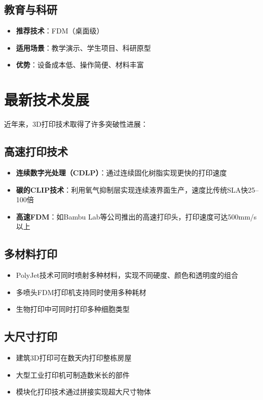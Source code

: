 \documentclass[12pt,UTF8]{ctexbook}
\begin{document}
\subsection{教育与科研}
\begin{itemize}
\item \textbf{推荐技术}：FDM（桌面级）
\item \textbf{适用场景}：教学演示、学生项目、科研原型
\item \textbf{优势}：设备成本低、操作简便、材料丰富
\end{itemize}

\section{最新技术发展}

近年来，3D打印技术取得了许多突破性进展：

\subsection{高速打印技术}
\begin{itemize}
\item \textbf{连续数字光处理（CDLP）}：通过连续固化树脂实现更快的打印速度
\item \textbf{碳的CLIP技术}：利用氧气抑制层实现连续液界面生产，速度比传统SLA快25--100倍
\item \textbf{高速FDM}：如Bambu Lab等公司推出的高速打印头，打印速度可达500mm/s以上
\end{itemize}

\subsection{多材料打印}
\begin{itemize}
\item PolyJet技术可同时喷射多种材料，实现不同硬度、颜色和透明度的组合
\item 多喷头FDM打印机支持同时使用多种耗材
\item 生物打印中可同时打印多种细胞类型
\end{itemize}

\subsection{大尺寸打印}
\begin{itemize}
\item 建筑3D打印可在数天内打印整栋房屋
\item 大型工业打印机可制造数米长的部件
\item 模块化打印技术通过拼接实现超大尺寸物体
\end{itemize}
\end{document}
